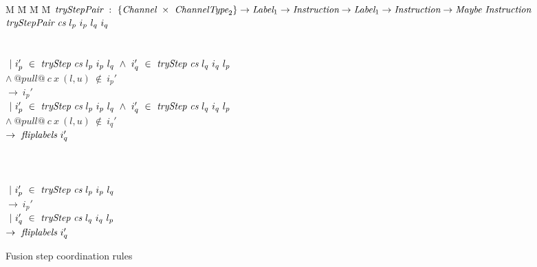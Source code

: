 \begin{figure}

\begin{tabbing}
M \= M \= M \= M \kill
$\textit{tryStepPair} ~:~ \{\textit{Channel} ~\times~ \textit{ChannelType}_2\} \to \textit{Label}_1 \to \textit{Instruction} \to \textit{Label}_1 \to \textit{Instruction} \to \textit{Maybe}~\textit{Instruction}$ \\
$\textit{tryStepPair} ~\textit{cs}~l_p~i_p~l_q~i_q$ \\
\\

\>  \\
\> $~|~i_p'~\in~\textit{tryStep}~\textit{cs}~l_p~i_p~l_q ~\wedge~ i_q'~\in~\textit{tryStep}~\textit{cs}~l_q~i_q~l_p$ \\
\> $\wedge~@pull@~c~x~(l,u)~\not\in~i_p'$ \\
\> $\to~i_p'$ \\
\> $~|~i_p'~\in~\textit{tryStep}~\textit{cs}~l_p~i_p~l_q ~\wedge~i_q'~\in~\textit{tryStep}~\textit{cs}~l_q~i_q~l_p$ \\
\> $\wedge~@pull@~c~x~(l,u)~\not\in~i_q'$ \\
\> $\to~\textit{fliplabels}~i_q'$ \\
\\

\>  \\
\>  \\
\> $~|~i_p'~\in~\textit{tryStep}~\textit{cs}~l_p~i_p~l_q$ \\
\> $\to~i_p'$ \\
\> $~|~i_q'~\in~\textit{tryStep}~\textit{cs}~l_q~i_q~l_p$ \\
\> $\to~\textit{fliplabels}~i_q'$ \\

\end{tabbing}

\caption{Fusion step coordination rules}
\label{fig:Fusion:Def:StepPair}
\end{figure}
